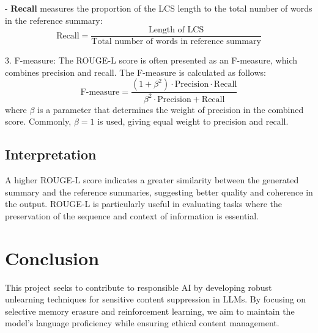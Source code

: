 \documentclass[11pt]{article}
\begin{document}
    - \textbf{Recall} measures the proportion of the LCS length to the total number of words in the reference summary:
    \begin{equation}
        \text{Recall} = \frac{\text{Length of LCS}}{\text{Total number of words in reference summary}}
    \end{equation}

    3. F-measure: The ROUGE-L score is often presented as an F-measure, which combines precision and recall. The F-measure is calculated as follows:
    \begin{equation}
        \text{F-measure} = \frac{(1 + \beta^2) \cdot \text{Precision} \cdot \text{Recall}}{\beta^2 \cdot \text{Precision} + \text{Recall}}
    \end{equation}
    where $\beta$ is a parameter that determines the weight of precision in the combined score. Commonly, $\beta = 1$ is used, giving equal weight to precision and recall.

    \subsection{Interpretation}

    A higher ROUGE-L score indicates a greater similarity between the generated summary and the reference summaries, suggesting better quality and coherence in the output. ROUGE-L is particularly useful in evaluating tasks where the preservation of the sequence and context of information is essential.


    \section{Conclusion}
    This project seeks to contribute to responsible AI by developing robust unlearning techniques for sensitive content suppression in LLMs. By focusing on selective memory erasure and reinforcement learning, we aim to maintain the model's language proficiency while ensuring ethical content management.


    
    
\end{document}
